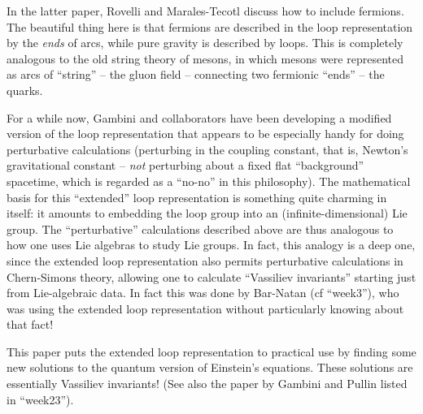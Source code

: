 \documentclass{article}
\def\tightlist{}
\renewcommand{\texttt}[1]{%
  \begingroup
  \ttfamily
  \begingroup\lccode`~=`/\lowercase{\endgroup\def~}{/\discretionary{}{}{}}%
  \begingroup\lccode`~=`[\lowercase{\endgroup\def~}{[\discretionary{}{}{}}%
  \begingroup\lccode`~=`.\lowercase{\endgroup\def~}{.\discretionary{}{}{}}%
  \catcode`/=\active\catcode`[=\active\catcode`.=\active
  \scantokens{#1\noexpand}%
  \endgroup
}
\begin{document}
In the latter paper, Rovelli and Marales-Tecotl discuss how to include
fermions. The beautiful thing here is that fermions are described in the
loop representation by the \emph{ends} of arcs, while pure gravity is
described by loops. This is completely analogous to the old string
theory of mesons, in which mesons were represented as arcs of ``string''
-- the gluon field -- connecting two fermionic ``ends'' -- the quarks.


For a while now, Gambini and collaborators have been developing a
modified version of the loop representation that appears to be
especially handy for doing perturbative calculations (perturbing in the
coupling constant, that is, Newton's gravitational constant --
\emph{not} perturbing about a fixed flat ``background'' spacetime, which
is regarded as a ``no-no'' in this philosophy). The mathematical basis
for this ``extended'' loop representation is something quite charming in
itself: it amounts to embedding the loop group into an
(infinite-dimensional) Lie group. The ``perturbative'' calculations
described above are thus analogous to how one uses Lie algebras to study
Lie groups. In fact, this analogy is a deep one, since the extended loop
representation also permits perturbative calculations in Chern-Simons
theory, allowing one to calculate ``Vassiliev invariants'' starting just
from Lie-algebraic data. In fact this was done by Bar-Natan (cf
``week3''), who was using the extended loop representation without
particularly knowing about that fact!

This paper puts the extended loop representation to practical use by
finding some new solutions to the quantum version of Einstein's
equations. These solutions are essentially Vassiliev invariants! (See
also the paper by Gambini and Pullin listed in ``week23'').

\end{document}
